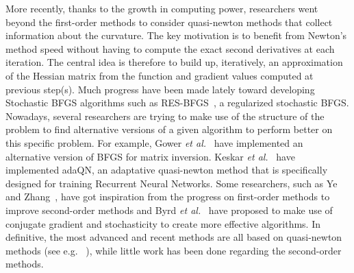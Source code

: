 \documentclass[conference]{IEEEtran}
\begin{document}


More recently, thanks to the growth in computing power, researchers went beyond the first-order methods to consider quasi-newton methods that collect information about the curvature. The key motivation is to benefit from Newton's method speed without having to compute the exact second derivatives at each iteration. The central idea is therefore to build up, iteratively, an approximation of the Hessian matrix from the function and gradient values computed at previous step(s). %
Much progress have been made lately toward developing Stochastic BFGS algorithms such as RES-BFGS~\cite{mokhtari_res:_2014}, a regularized stochastic BFGS. Nowadays, several researchers are trying to make use of the structure of the problem to find alternative versions of a given algorithm to perform better on this specific problem. For example, Gower {\it et al.}~\cite{gower_accelerated_2018} have implemented an alternative version of BFGS for matrix inversion. Keskar {\it et al.}~\cite{keskar_adaqn:_2016} have implemented adaQN, an adaptative quasi-newton method that is specifically designed for training Recurrent Neural Networks. Some researchers, such as Ye and Zhang~\cite{ye_nestrovs_2017}, have got inspiration from the progress on first-order methods to improve second-order methods and Byrd {\it et al.}~\cite{byrd_use_2011} have proposed to make use of conjugate gradient and stochasticity to create more effective algorithms. In definitive, the most advanced and recent methods are all based on quasi-newton methods (see e.g. ~\cite{kiros_training_2013,bordes_sgd-qn:_2009,bordes_erratum:_2010,agarwal_second-order_2016}), while little work has been done regarding the second-order methods.
\end{document}
